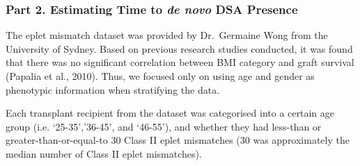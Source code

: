 \documentclass[a4paper,9pt,twocolumn,twoside,]{pinp}
\begin{document}
\hypertarget{part-2.-estimating-time-to-de-novo-dsa-presence}{%
\subsubsection{\texorpdfstring{Part 2. Estimating Time to \emph{de novo}
DSA
Presence}{Part 2. Estimating Time to de novo DSA Presence}}\label{part-2.-estimating-time-to-de-novo-dsa-presence}}

The eplet mismatch dataset was provided by Dr.~Germaine Wong from the
University of Sydney. Based on previous research studies conducted, it
was found that there was no significant correlation between BMI category
and graft survival (Papalia et al., 2010). Thus, we focused only on
using age and gender as phenotypic information when stratifying the
data.

Each transplant recipient from the dataset was categorised into a
certain age group (i.e. `25-35','36-45', and `46-55'), and whether they
had less-than or greater-than-or-equal-to 30 Class II eplet mismatches
(30 was approximately the median number of Class II eplet mismatches).

\begin{Shaded}
\end{Shaded}
\end{document}

